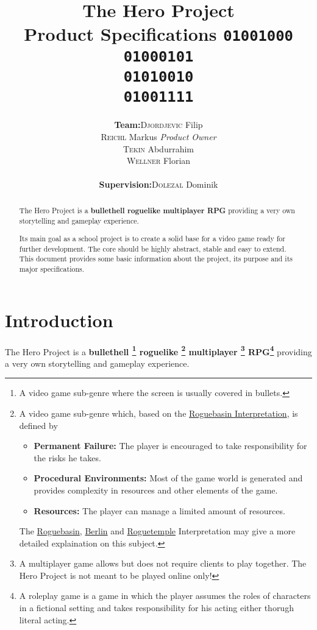 \documentclass[11pt]{article}
\title{
  \textbf{The Hero Project}\\
  \large{Product Specifications}
  \linebreak
  \linebreak
  \small{\texttt{01001000\\01000101\\01010010\\01001111}}
}
\author{
  \begin{tabular}{rl}
    \textbf{Team:}
    & \textsc{Djordjevic} Filip\\
    & \textsc{Reichl} Markus \small{\textit{Product Owner}}\\
    & \textsc{Tekin} Abdurrahim\\
    & \textsc{Wellner} Florian\\
    \\
    \textbf{Supervision:}
    & \textsc{Dolezal} Dominik
  \end{tabular}
}
\begin{document}
\begin{titlepage}
  \clearpage
  \maketitle
  \thispagestyle{empty}
  
  \begin{abstract}
    \begin{flushleft}
      The Hero Project is a \textbf{bullethell roguelike multiplayer RPG} providing a very own storytelling and gameplay experience.
      
      Its main goal as a school project is to create a solid base for a video game ready for further development. The core should be highly abstract, stable and easy to extend.
      \linebreak
      \linebreak
      This document provides some basic information about the project, its purpose and its major specifications.
     \end{flushleft}
  \end{abstract}
\end{titlepage}

\tableofcontents
\newpage

\section{Introduction}
The Hero Project is a \textbf{
  bullethell
  \footnote{A video game sub-genre where the screen is usually covered in bullets.}
  roguelike
  \footnote{A video game sub-genre which, based on the \href{http://roguebasin.com/roguelike-definition}{Roguebasin Interpretation}, is defined by 
    \begin{itemize}
      \item \textbf{Permanent Failure:} The player is encouraged to take responsibility for the risks he takes.
      \item \textbf{Procedural Environments:} Most of the game world is generated and provides complexity in resources and other elements of the game.
      \item \textbf{Resources:} The player can manage a limited amount of resources.
    \end{itemize}
    The \href{http://roguebasin.com/roguelike-definition}{Roguebasin}, \href{http://roguebasin.com/index.php?title=Berlin_Interpretation}{Berlin} and \href{http://roguetemple.com/roguelike-definition}{Roguetemple} Interpretation may give a more detailed explaination on this subject.
  }
  multiplayer
  \footnote{A multiplayer game allows but does not require clients to play together. The Hero Project is not meant to be played online only!}
  RPG\footnote{A roleplay game is a game in which the player assumes the roles of characters in a fictional setting and takes responsibility for his acting either thorugh literal acting.}
} providing a very own storytelling and gameplay experience.
\end{document}
